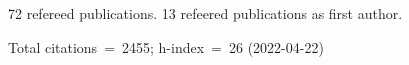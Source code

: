 72 refereed publications. 13 refeered publications as first author.

Total citations~=~2455; h-index~=~26 (2022-04-22)